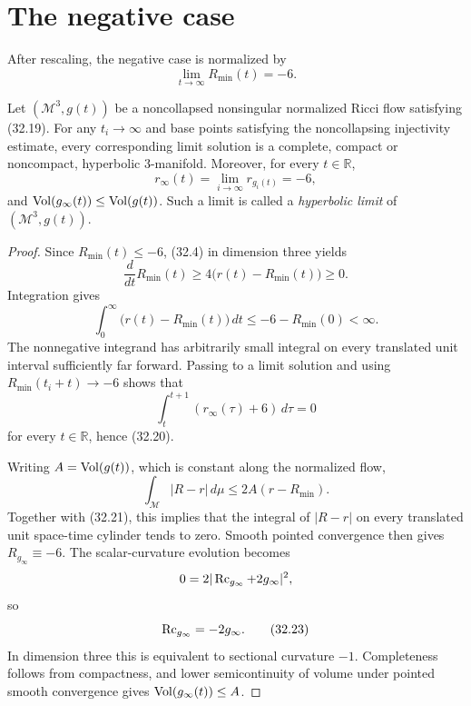 \section{The negative case}

After rescaling, the negative case is normalized by
\begin{equation*}
 \lim_{t\to\infty}R_{\min}(t)=-6.
 \tag{32.19}
\end{equation*}

\begin{proposition}
\label{prop:chow-iv-negative-case-hyperbolic-limit}


Let $(\mathcal M^3,g(t))$ be a noncollapsed nonsingular normalized Ricci
flow satisfying (32.19).  For any $t_i\to\infty$ and base points satisfying
the noncollapsing injectivity estimate, every corresponding limit solution
is a complete, compact or noncompact, hyperbolic $3$-manifold.  Moreover,
for every $t\in\mathbb R$,
\begin{equation*}
 r_\infty(t)=\lim_{i\to\infty}r_{g_i(t)}=-6,
 \tag{32.20}
\end{equation*}
and $\operatorname{Vol}(g_\infty(t))\le\operatorname{Vol}(g(t))$.  Such a limit is called a
\emph{hyperbolic limit} of $(\mathcal M^3,g(t))$.
\end{proposition}
\begin{proof}
\sketch
Since $R_{\min}(t)\le-6$, (32.4) in dimension three yields
\[
 \frac d{dt}R_{\min}(t)
 \ge4\bigl(r(t)-R_{\min}(t)\bigr)\ge0.
\]
Integration gives
\begin{equation*}
 \int_0^\infty\bigl(r(t)-R_{\min}(t)\bigr)\,dt
 \le -6-R_{\min}(0)<\infty.
 \tag{32.21}
\end{equation*}
The nonnegative integrand has arbitrarily small integral on every translated
unit interval sufficiently far forward.  Passing to a limit solution and
using $R_{\min}(t_i+t)\to-6$ shows that
\[
 \int_t^{t+1}(r_\infty(\tau)+6)\,d\tau=0
\]
for every $t\in\mathbb R$, hence (32.20).

Writing $A=\operatorname{Vol}(g(t))$, which is constant along the normalized flow,
\[
 \int_{\mathcal M}|R-r|\,d\mu
 \le2A(r-R_{\min}).
\]
Together with (32.21), this implies that the integral of $|R-r|$ on every
translated unit space-time cylinder tends to zero.  Smooth pointed
convergence then gives $R_{g_\infty}\equiv-6$.  The scalar-curvature
evolution becomes
\[
 0=2|\operatorname{Rc}_{g_\infty}+2g_\infty|^2,
\]
so
\begin{equation*}
 \operatorname{Rc}_{g_\infty}=-2g_\infty.
 \tag{32.23}
\end{equation*}
In dimension three this is equivalent to sectional curvature $-1$.
Completeness follows from compactness, and lower semicontinuity of volume
under pointed smooth convergence gives
$\operatorname{Vol}(g_\infty(t))\le A$.
\end{proof}
